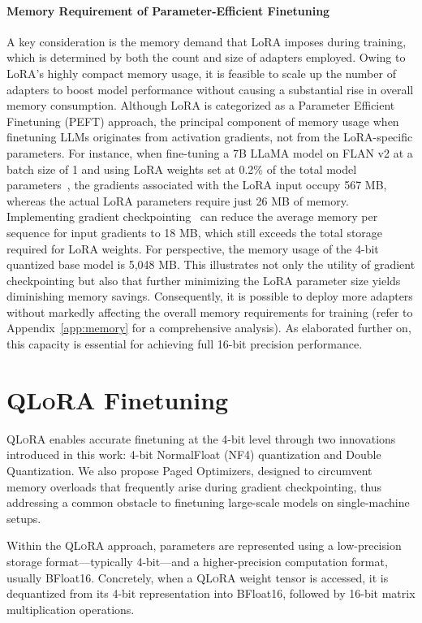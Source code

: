 \paragraph{Memory Requirement of Parameter-Efficient Finetuning} A key consideration is the memory demand that LoRA imposes during training, which is determined by both the count and size of adapters employed. Owing to LoRA’s highly compact memory usage, it is feasible to scale up the number of adapters to boost model performance without causing a substantial rise in overall memory consumption. Although LoRA is categorized as a Parameter Efficient Finetuning (PEFT) approach, the principal component of memory usage when finetuning LLMs originates from activation gradients, not from the LoRA-specific parameters. For instance, when fine-tuning a 7B LLaMA model on FLAN v2 at a batch size of 1 and using LoRA weights set at 0.2\% of the total model parameters~\citep{hu2021lora,liu2022few}, the gradients associated with the LoRA input occupy 567 MB, whereas the actual LoRA parameters require just 26 MB of memory. Implementing gradient checkpointing~\citep{chen2016training} can reduce the average memory per sequence for input gradients to 18 MB, which still exceeds the total storage required for LoRA weights. For perspective, the memory usage of the 4-bit quantized base model is 5,048 MB. This illustrates not only the utility of gradient checkpointing but also that further minimizing the LoRA parameter size yields diminishing memory savings. Consequently, it is possible to deploy more adapters without markedly affecting the overall memory requirements for training (refer to Appendix~\ref{app:memory} for a comprehensive analysis). As elaborated further on, this capacity is essential for achieving full 16-bit precision performance.

\section{\textsc{QLoRA} Finetuning}

\textsc{QLoRA} enables accurate finetuning at the 4-bit level through two innovations introduced in this work: 4-bit NormalFloat (NF4) quantization and Double Quantization. We also propose Paged Optimizers, designed to circumvent memory overloads that frequently arise during gradient checkpointing, thus addressing a common obstacle to finetuning large-scale models on single-machine setups.

Within the \textsc{QLoRA} approach, parameters are represented using a low-precision storage format—typically 4-bit—and a higher-precision computation format, usually BFloat16. Concretely, when a \textsc{QLoRA} weight tensor is accessed, it is dequantized from its 4-bit representation into BFloat16, followed by 16-bit matrix multiplication operations.

